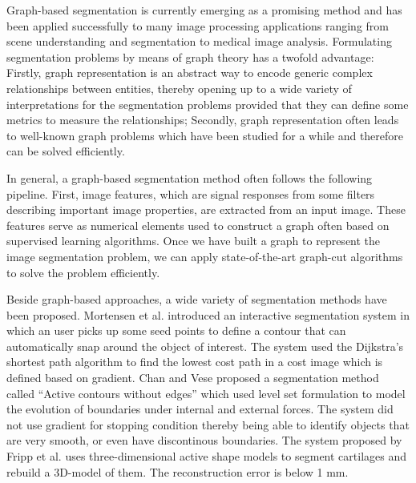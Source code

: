 \documentclass{SMBV12}
\begin{document}
Graph-based segmentation is currently emerging as a promising method and has been applied successfully to many image processing applications ranging from scene understanding and segmentation to medical image analysis. Formulating segmentation problems by means of graph theory has a twofold advantage: Firstly, graph representation is an abstract way to encode generic complex relationships between entities, thereby opening up to a wide variety of interpretations for the segmentation problems provided that they can define some metrics to measure the relationships; Secondly, graph representation often leads to well-known graph problems which have been studied for a while and therefore can be solved efficiently.

In general, a graph-based segmentation method often follows the following pipeline. First, image features, which are signal responses from some filters describing important image properties, are extracted from an input image. These features serve as numerical elements used to construct a graph often based on supervised learning algorithms. Once we have built a graph to represent the image segmentation problem, we can apply state-of-the-art graph-cut algorithms to solve the problem efficiently. 

Beside graph-based approaches, a wide variety of segmentation methods have been proposed. Mortensen et al. \cite{mortensen1995intelligent} introduced an interactive segmentation system in which an user picks up some seed points to define a contour that can automatically snap around the object of interest. The system used the Dijkstra's shortest path algorithm to find the lowest cost path in a cost image which is defined based on gradient. Chan and Vese proposed a segmentation method called ``Active contours without edges'' \cite{chan2001active} which used level set formulation to model the evolution of boundaries under internal and external forces. The system did not use gradient for stopping condition thereby being able to identify objects that are very smooth, or even have discontinous boundaries. The system proposed by Fripp et al. \cite{fripp2007automatic} uses three-dimensional active shape models to segment cartilages and rebuild a 3D-model of them. The reconstruction error is below 1 mm.
\end{document}

